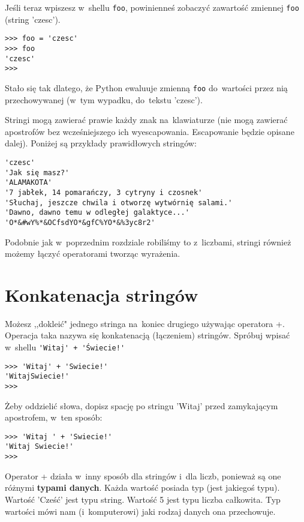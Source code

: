\documentclass{book}
\begin{document}
Jeśli teraz wpiszesz w~shellu \lstinline{foo}, powinienneś zobaczyć zawartość zmiennej \lstinline{foo} (string 'czesc'). 


\begin{lstlisting}
>>> foo = 'czesc'
>>> foo
'czesc'
>>>
\end{lstlisting}

Stało się tak dlatego, że Python ewaluuje zmienną \lstinline{foo} do~wartości przez nią przechowywanej (w~tym wypadku, do~tekstu 'czesc').

Stringi mogą zawierać prawie każdy znak na~klawiaturze (nie mogą zawierać apostrofów bez wcześniejszego ich wyescapowania. Escapowanie będzie opisane dalej). Poniżej są przykłady prawidłowych stringów:

\begin{lstlisting}
'czesc'
'Jak się masz?'
'ALAMAKOTA'
'7 jabłek, 14 pomarańczy, 3 cytryny i czosnek'
'Słuchaj, jeszcze chwila i otworzę wytwórnię salami.'
'Dawno, dawno temu w odległej galaktyce...'
'O*&#wY%*&OCfsdYO*&gfC%YO*&%3yc8r2'
\end{lstlisting}

Podobnie jak w~poprzednim rozdziale robiliśmy to z~liczbami, stringi również możemy łączyć operatorami tworząc wyrażenia.

\section{Konkatenacja stringów}

Możesz ,,dokleić" jednego stringa na~koniec drugiego używając operatora +. Operacja taka nazywa się konkatenacją (łączeniem) stringów. Spróbuj wpisać w~shellu \lstinline{'Witaj' + 'Świecie!'}

\begin{lstlisting}
>>> 'Witaj' + 'Swiecie!'
'WitajSwiecie!'
>>>
\end{lstlisting}

Żeby oddzielić słowa, dopisz spację po stringu 'Witaj' przed zamykającym apostrofem, w~ten sposób:

\begin{lstlisting}
>>> 'Witaj ' + 'Swiecie!'
'Witaj Swiecie!'
>>> 
\end{lstlisting}

Operator + działa w~inny sposób dla stringów i~dla liczb, ponieważ są one różnymi {\bf typami danych}. Każda wartość posiada typ (jest jakiegoś typu). Wartość 'Cześć' jest typu string. Wartość 5 jest typu liczba całkowita. Typ wartości mówi nam (i~komputerowi) jaki rodzaj danych ona przechowuje. 
\end{document}
